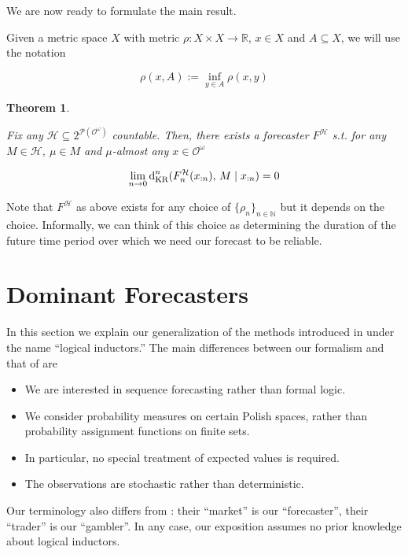 \documentclass[11pt]{article}
\theoremstyle{definition}
\theoremstyle{plain}
\newtheorem{theorem}{Theorem}%
\newcommand{\Nats}{\mathbb{N}}
\newcommand{\Reals}{\mathbb{R}}
\newcommand{\Sq}[2]{\{#1\}_{#2 \in \Nats}}
\newcommand{\Sqn}[1]{\Sq{#1}{n}}
\newcommand{\PM}{\mathcal{P}}
\newcommand{\DKR}{\operatorname{d}_{\textnormal{KR}}}
\newcommand{\Ob}{\mathcal{O}}
\newcommand{\OO}{\Ob^\omega}
\newcommand{\PMO}{\PM(\OO)}
\newcommand{\MC}{\mathcal{H}}
\begin{document}
We are now ready to formulate the main result.

Given a metric space $X$ with metric $\rho: X \times X \rightarrow \Reals$, $x \in X$ and $A \subseteq X$, we will use the notation

\begin{equation}
\rho(x,A):=\inf_{y \in A} \rho(x,y)
\end{equation}

\begin{theorem}
\label{thm:main}

Fix any $\MC \subseteq 2^{\PMO}$ countable. Then, there exists a forecaster $F^\MC$ s.t. for any $M \in \MC$, $\mu \in M$ and $\mu$-almost any $x \in \OO$

\begin{equation}
\label{eqn:thm_main}
\lim_{n \rightarrow 0} \DKR^n(F^\MC_n(x_{:n}),\, M \mid x_{:n}) = 0
\end{equation}

\end{theorem}

Note that $F^\MC$ as above exists for any choice of $\Sqn{\rho_n}$ but it depends on the choice. Informally, we can think of this choice as determining the duration of the future time period over which we need our forecast to be reliable.

\section{Dominant Forecasters}
\label{sec:garrabrant}

In this section we explain our generalization of the methods introduced in \cite{Garrabrant_2016} under the name \enquote{logical inductors.} The main differences between our formalism and that of \cite{Garrabrant_2016} are

\begin{itemize}
\item 
We are interested in sequence forecasting rather than formal logic.
\item
We consider probability measures on certain Polish spaces, rather than probability assignment functions on finite sets.
\item
In particular, no special treatment of expected values is required.
\item
The observations are stochastic rather than deterministic.
\end{itemize}

Our terminology also differs from \cite{Garrabrant_2016}: their \enquote{market} is our \enquote{forecaster}, their \enquote{trader} is our \enquote{gambler}. In any case, our exposition assumes no prior knowledge about logical inductors.
\end{document}
